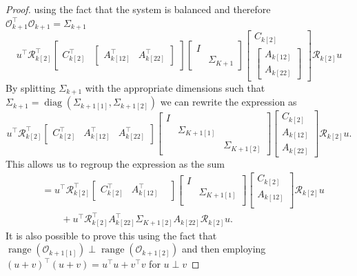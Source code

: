 \documentclass[numbers=noenddot,doctype=mastersthesis,BCOR=15mm,biblatex]{ldvbook}%
\DeclareMathOperator{\diag}{diag}
\DeclareMathOperator{\range}{range}
\newcommand{\R}{\mathcal{R}} %
\newcommand{\Ob}{\mathcal{O}} %
\newcommand{\eye}{I} %
\begin{document}
\begin{proof}
using the fact that the system is balanced and therefore $\Ob_{k+1}^\top \Ob_{k+1} = \Sigma_{k+1}$
\begin{equation}
u^\top
\R_{k[2]}^\top
\begin{bmatrix}
C_{k[2]}^\top&
\begin{bmatrix}
A_{k[12]}^\top&
A_{k[22]}^\top
\end{bmatrix}
\end{bmatrix} 
\begin{bmatrix}
\eye & \\
& \Sigma_{K+1}
\end{bmatrix} 
\begin{bmatrix}
C_{k[2]}\\
\begin{bmatrix}
A_{k[12]}\\
A_{k[22]}
\end{bmatrix}
\end{bmatrix}  
\R_{k[2]} u
\end{equation}
By splitting $\Sigma_{k+1}$ with the appropriate dimensions such that  $\Sigma_{k+1} = \diag(\Sigma_{k+1[1]},\Sigma_{k+1[2]})$ we can rewrite the expression as
\begin{equation}
u^\top
\R_{k[2]}^\top
\begin{bmatrix}
C_{k[2]}^\top&
A_{k[12]}^\top&
A_{k[22]}^\top
\end{bmatrix} 
\begin{bmatrix}
\eye & \\
& \Sigma_{K+1[1]}\\
& & \Sigma_{K+1[2]}
\end{bmatrix} 
\begin{bmatrix}
C_{k[2]}\\
A_{k[12]}\\
A_{k[22]}
\end{bmatrix}  
\R_{k[2]} u
.
\end{equation}
This allows us to regroup the expression as the sum
\begin{align}
	&=
	u^\top
	\R_{k[2]}^\top
	\begin{bmatrix}
	C_{k[2]}^\top&
	A_{k[12]}^\top&
	\end{bmatrix} 
	\begin{bmatrix}
	\eye & \\
	& \Sigma_{K+1[1]}\\
	\end{bmatrix} 
	\begin{bmatrix}
	C_{k[2]}\\
	A_{k[12]}\\
	\end{bmatrix}  
	\R_{k[2]} u
\\&\quad\quad+
	u^\top
	\R_{k[2]}^\top
	A_{k[22]}^\top 
	\Sigma_{K+1[2]}
	A_{k[22]} 
	\R_{k[2]} u
	.
\end{align}
	It is also possible to prove this using the fact that $\range(\Ob_{k+1[1]})\perp \range(\Ob_{k+1[2]})$ and then employing $(u+v)^\top (u+v) = u^\top u + v^\top v$ for $u \perp v$
\end{proof}
\end{document}
